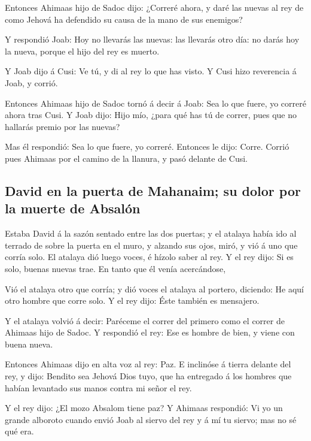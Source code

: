  Entonces Ahimaas hijo de Sadoc dijo: ¿Correré ahora, y
daré las nuevas al rey de como Jehová ha defendido su causa de la mano
de sus enemigos?

 Y respondió Joab: Hoy no llevarás las nuevas: las llevarás
otro día: no darás hoy la nueva, porque el hijo del rey es muerto.

 Y Joab dijo á Cusi: Ve tú, y di al rey lo que has visto. Y
Cusi hizo reverencia á Joab, y corrió.

 Entonces Ahimaas hijo de Sadoc tornó á decir á Joab: Sea
lo que fuere, yo correré ahora tras Cusi. Y Joab dijo: Hijo mío, ¿para
qué has tú de correr, pues que no hallarás premio por las nuevas?

 Mas él respondió: Sea lo que fuere, yo correré. Entonces
le dijo: Corre. Corrió pues Ahimaas por el camino de la llanura, y pasó
delante de Cusi.

\hypertarget{david-en-la-puerta-de-mahanaim-su-dolor-por-la-muerte-de-absaluxf3n}{%
\subsection{David en la puerta de Mahanaim; su dolor por la muerte de
Absalón}\label{david-en-la-puerta-de-mahanaim-su-dolor-por-la-muerte-de-absaluxf3n}}

 Estaba David á la sazón sentado entre las dos puertas; y
el atalaya había ido al terrado de sobre la puerta en el muro, y alzando
sus ojos, miró, y vió á uno que corría solo.  El atalaya
dió luego voces, é hízolo saber al rey. Y el rey dijo: Si es solo,
buenas nuevas trae. En tanto que él venía acercándose,

 Vió el atalaya otro que corría; y dió voces el atalaya al
portero, diciendo: He aquí otro hombre que corre solo. Y el rey dijo:
Éste también es mensajero.

 Y el atalaya volvió á decir: Paréceme el correr del
primero como el correr de Ahimaas hijo de Sadoc. Y respondió el rey: Ese
es hombre de bien, y viene con buena nueva.

 Entonces Ahimaas dijo en alta voz al rey: Paz. E inclinóse
á tierra delante del rey, y dijo: Bendito sea Jehová Dios tuyo, que ha
entregado á los hombres que habían levantado sus manos contra mi señor
el rey.

 Y el rey dijo: ¿El mozo Absalom tiene paz? Y Ahimaas
respondió: Vi yo un grande alboroto cuando envió Joab al siervo del rey
y á mí tu siervo; mas no sé qué era.

